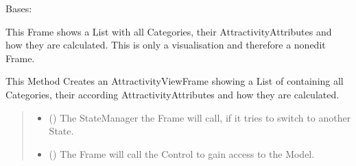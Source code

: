 \documentclass[letterpaper,10pt,english]{sphinxmanual}
\begin{document}
\begin{fulllineitems}
\label{\detokenize{apidoc/src.osm_configurator.view.toplevelframes:src.osm_configurator.view.toplevelframes.attractivity_view_frame.AttractivityViewFrame}}
\pysigstartsignatures
{}
\pysigstopsignatures
\sphinxAtStartPar
Bases: {\hyperref[\detokenize{apidoc/src.osm_configurator.view.toplevelframes:src.osm_configurator.view.toplevelframes.top_level_frame.TopLevelFrame}]{}}

\sphinxAtStartPar
This Frame shows a List with all Categories, their Attractivity\sphinxhyphen{}Attributes and how they are calculated.
This is only a visualisation and therefore a non\sphinxhyphen{}edit Frame.

\begin{fulllineitems}
\label{\detokenize{apidoc/src.osm_configurator.view.toplevelframes:src.osm_configurator.view.toplevelframes.attractivity_view_frame.AttractivityViewFrame.__init__}}
\pysigstartsignatures
{}
\pysigstopsignatures
\sphinxAtStartPar
This Method Creates an AttractivityViewFrame showing a List of containing all Categories,
their according Attractivity\sphinxhyphen{}Attributes and how they are calculated.
\begin{quote}\begin{description}
\begin{itemize}
\item {} 
\sphinxAtStartPar
{} ({\hyperref[\detokenize{apidoc/src.osm_configurator.view.states:src.osm_configurator.view.states.state_manager.StateManager}]{}}) \textendash{} The StateManager the Frame will call, if it tries to switch to another State.

\item {} 
\sphinxAtStartPar
{} ({\hyperref[\detokenize{apidoc/src.osm_configurator.control:src.osm_configurator.control.control_interface.IControl}]{}}) \textendash{} The Frame will call the Control to gain access to the Model.

\end{itemize}

\end{description}\end{quote}

\end{fulllineitems}


\end{fulllineitems}
\end{document}
